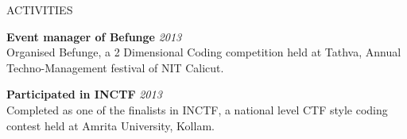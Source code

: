 \documentclass{resume} %
\begin{document}
\begin{rSection}{ACTIVITIES}

{\bf Event manager of Befunge} \hfill {\em 2013} \\ 
Organised Befunge, a 2 Dimensional Coding competition held at Tathva, Annual Techno-Management festival of NIT Calicut. 

{\bf Participated in INCTF} \hfill {\em 2013} \\ 
Completed as one of the finalists in INCTF, a national level CTF style coding contest held at Amrita University, Kollam.


\end{rSection}




\end{document}
